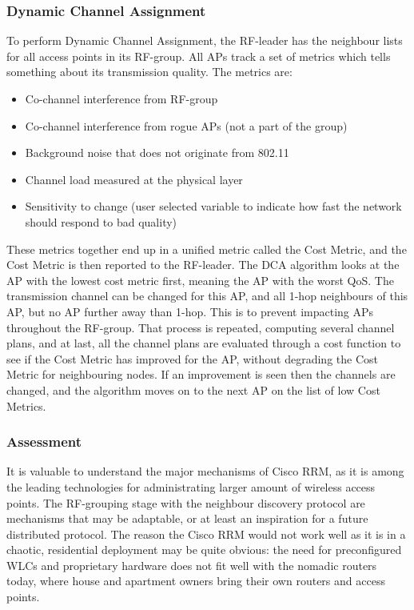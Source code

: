 \subsubsection{Dynamic Channel Assignment}
To perform Dynamic Channel Assignment, the RF-leader has the neighbour lists for all access points in 
its RF-group. All APs track a set of metrics which tells something about its transmission quality. The metrics are: 
\begin{itemize}
	\item Co-channel interference from RF-group
	\item Co-channel interference from rogue APs (not a part of the group)
	\item Background noise that does not originate from 802.11
	\item Channel load measured at the physical layer
	\item Sensitivity to change (user selected variable to indicate how fast the network should respond to bad quality)
\end{itemize}
These metrics together end up in a unified metric called the Cost Metric, and the Cost Metric is then reported to the RF-leader. 
The DCA algorithm looks at the AP with the lowest cost metric first, meaning the AP with the worst QoS. The transmission channel can be changed for
this AP, and all 1-hop neighbours of this AP, but no AP further away than 1-hop. This is to prevent impacting APs throughout the RF-group.
That process is repeated, computing several channel plans, and at last, all the channel plans are evaluated through a cost function
to see if the Cost Metric has improved for the AP, without degrading the Cost Metric for neighbouring nodes. If an improvement is seen
then the channels are changed, and the algorithm moves on to the next AP on the list of low Cost Metrics.  

\subsubsection{Assessment}
It is valuable to understand the major mechanisms of Cisco RRM, as it is among the leading technologies for administrating larger amount of wireless access points. 
The RF-grouping stage with the neighbour discovery protocol are mechanisms that may be adaptable, or at least an inspiration for a future distributed protocol. The reason 
the Cisco RRM would not work well as it is in a chaotic, residential deployment may be quite obvious: the need for preconfigured WLCs and proprietary hardware does not fit well with the nomadic 
routers today, where house and apartment owners bring their own routers and access points. 



